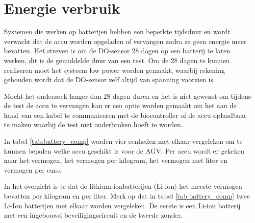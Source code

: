 \section{Energie verbruik}
Systemen die werken op batterijen hebben een beperkte tijdsduur en wordt verwacht dat de accu worden opgeladen of vervangen zodra ze geen energie meer bevatten. Het streven is om de DO-sensor 28 dagen op een batterij te laten werken, dit is de gemiddelde duur van een test. Om de 28 dagen te kunnen realiseren moet het systeem low power worden gemaakt, waarbij rekening gehouden wordt dat de DO-sensor zelf altijd van spanning voorzien is.

Mocht het onderzoek langer dan 28 dagen duren en het is niet gewenst om tijdens de test de accu te vervangen kan er een optie worden gemaakt om het aan de hand van een kabel te communiceren met de biocontroller of de accu oplaadbaar te maken waarbij de test niet onderbroken hoeft te worden. 

In tabel \ref{tab:battery_comp} worden vier eenheden met elkaar vergeleken om te kunnen bepalen welke accu geschikt is voor de AGV. Per accu wordt er gekeken naar het vermogen, het vermogen per kilogram, het vermogen met liter en vermogen per euro. 

\begin{table}[H]
	\centering
	\caption{Accu vergelijking}
	\label{tab:battery_comp}
\end{table}

In het overzicht is te dat de lithium-ionbatterijen (Li-ion) het meeste vermogen bevatten per kilogram en per liter. 
Merk op dat in tabel \ref{tab:battery_comp} twee Li-Ion batterijen met elkaar worden vergeleken. De eerste is een Li-ion batterij met een ingebouwd beveiligingscircuit en de tweede zonder. 

